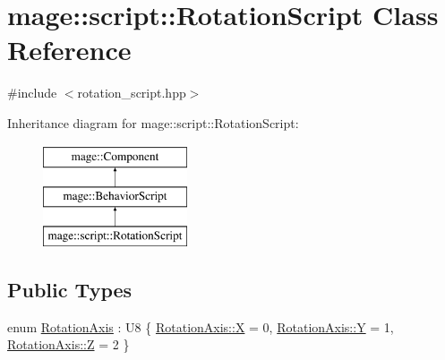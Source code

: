 \hypertarget{classmage_1_1script_1_1_rotation_script}{}\section{mage\+:\+:script\+:\+:Rotation\+Script Class Reference}
\label{classmage_1_1script_1_1_rotation_script}


{\ttfamily \#include $<$rotation\+\_\+script.\+hpp$>$}

Inheritance diagram for mage\+:\+:script\+:\+:Rotation\+Script\+:\begin{figure}[H]
\begin{center}
\leavevmode
\includegraphics[height=3.000000cm]{classmage_1_1script_1_1_rotation_script}
\end{center}
\end{figure}
\subsection*{Public Types}
\begin{DoxyCompactItemize}
\item 
enum \mbox{\hyperlink{classmage_1_1script_1_1_rotation_script_a54e1d1d0af65f43f5bc5ad65a4b9c00a}{Rotation\+Axis}} \+: U8 \{ \mbox{\hyperlink{classmage_1_1script_1_1_rotation_script_a54e1d1d0af65f43f5bc5ad65a4b9c00aa02129bb861061d1a052c592e2dc6b383}{Rotation\+Axis\+::X}} = 0, 
\mbox{\hyperlink{classmage_1_1script_1_1_rotation_script_a54e1d1d0af65f43f5bc5ad65a4b9c00aa57cec4137b614c87cb4e24a3d003a3e0}{Rotation\+Axis\+::Y}} = 1, 
\mbox{\hyperlink{classmage_1_1script_1_1_rotation_script_a54e1d1d0af65f43f5bc5ad65a4b9c00aa21c2e59531c8710156d34a3c30ac81d5}{Rotation\+Axis\+::Z}} = 2
 \}
\end{DoxyCompactItemize}
